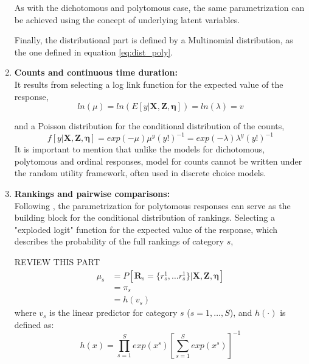 \begin{enumerate}
	As with the dichotomous and polytomous case, the same parametrization can be achieved using the concept of underlying latent variables.
	
	Finally, the distributional part is defined by a Multinomial distribution, as the one defined in equation \ref{eq:dist_poly}.
	
	
		
	
	\item \textbf{Counts and continuous time duration:} \\
	It results from selecting a log link function for the expected value of the response,
	\begin{equation} \label{eq:link_count}
		ln(\mu) = ln(E[y | \mathbf{X}, \mathbf{Z}, \pmb{\eta}]) = ln(\lambda) = v
	\end{equation}
	
	and a Poisson distribution for the conditional distribution of the counts,
	\begin{equation} \label{eq:dist_count}
		f[y| \mathbf{X}, \mathbf{Z}, \pmb{\eta}] = exp(-\mu) \mu^{y} (y!)^{-1} = exp(-\lambda) \lambda^{y} (y!)^{-1}
	\end{equation}
	It is important to mention that unlike the models for dichotomous, polytomous and ordinal responses, model for counts cannot be written under the random utility framework, often used in discrete choice models.
	
	\item \textbf{Rankings and pairwise comparisons:} \\
	Following \citet{Rabe_et_al_2003a}, the parametrization for polytomous responses can serve as the building block for the conditional distribution of rankings. Selecting a "exploded logit" function \citep{Chapaaan_et_al_1982} for the expected value of the response, which describes the probability of the full rankings of category $s$,
	
	{\color{red} REVIEW THIS PART
	\begin{equation} \label{eq:link_rank}
		\begin{split}
			\mu_{s} &= P[\mathbf{R}_{s}= \{ r_{s}^{1}, \dots r_{s}^{1}\} | \mathbf{X}, \mathbf{Z}, \pmb{\eta}] \\
			& = \pi_{s} \\
			&= h(v_{s})
		\end{split}
	\end{equation}	
	where $v_{s}$ is the linear predictor for category $s$ ($s=1, \dots, S$), and $h(\cdot)$ is defined as:
	\begin{equation} \label{eq:response_rank}
		h(x) = \prod_{s=1}^{S} exp(x^{s})\left[\sum_{s=1}^{S} exp(x^{s})\right]^{-1}
	\end{equation}

}
\end{enumerate}
